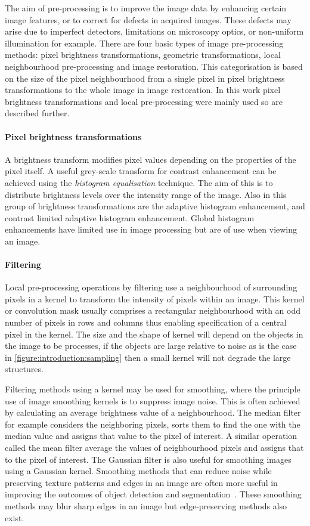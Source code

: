 The aim of pre-processing is to improve the image data by enhancing certain image features, or to correct for defects in acquired images. These defects may arise due to imperfect detectors, limitations on microscopy optics, or non-uniform illumination for example. There are four basic types of image pre-processing methods: pixel brightness transformations, geometric transformations, local neighbourhood pre-processing and image restoration. This categorisation is based on the size of the pixel neighbourhood from a single pixel in pixel brightness transformations to the whole image in image restoration. In this work pixel brightness transformations and local pre-processing were mainly used so are described further.

\paragraph{Pixel brightness transformations} A brightness transform modifies pixel values depending on the properties of the pixel itself. A useful grey-scale transform for contrast enhancement can be achieved using the \emph{histogram equalisation} technique. The aim of this is to distribute brightness levels over the intensity range of the image. Also in this group of brightness transformations are the adaptive histogram enhancement, and contrast limited adaptive histogram enhancement. Global histogram enhancements have limited use in image processing but are of use when viewing an image.

\paragraph{Filtering} Local pre-processing operations by filtering use a neighbourhood of surrounding pixels in a kernel to transform the intensity of pixels within an image. This kernel or convolution mask usually comprises a rectangular neighbourhood with an odd number of pixels in rows and columns thus enabling specification of a central pixel in the kernel. The size and the shape of kernel will depend on the objects in the image to be processes, if the objects are large relative to noise as is the case in \autoref{figure:introduction:sampling} then a small kernel will not degrade the large structures.

Filtering methods using a kernel  may be used for smoothing, where the principle use of image smoothing kernels is to suppress image noise. This is often achieved by calculating an average brightness value of a neighbourhood. The median filter for example considers the neighboring pixels, sorts them to find the one with the median value and assigns that value to the pixel of interest. A similar operation called the mean filter average the values of neighbourhood pixels and assigns that to the pixel of interest. The Gaussian filter is also useful for smoothing images using a Gaussian kernel. Smoothing methods that can reduce noise while preserving texture patterns and edges in an image are often more useful in improving the outcomes of object detection and segmentation~\cite{Sonka2007}. These smoothing methods may blur sharp edges in an image but edge-preserving methods also exist.

